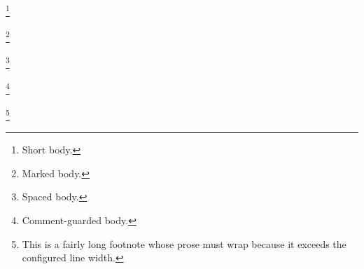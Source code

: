 \footnote
{Short body.}

\footnote
[7]
{Marked body.}

\footnote {Spaced body.}

\footnote%
{Comment-guarded body.}

\footnote
{This is a fairly long footnote whose prose must wrap because it exceeds the configured line width.}
